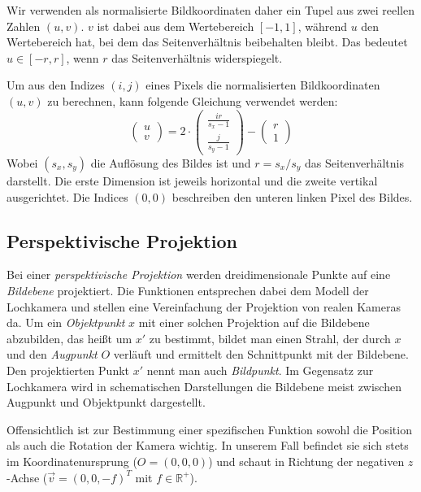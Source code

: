 \documentclass[ngerman,a4paper]{scrartcl}
\def \R{\mathbb{R}}
\begin{document}
Wir verwenden als normalisierte Bildkoordinaten daher ein Tupel aus zwei reellen Zahlen $(u,v)$. $v$ ist dabei aus dem Wertebereich $[-1,1]$, während $u$ den Wertebereich hat, bei dem das Seitenverhältnis beibehalten bleibt. Das bedeutet $u \in [-r,r]$, wenn $r$ das Seitenverhältnis widerspiegelt.

Um aus den Indizes $(i,j)$ eines Pixels die normalisierten Bildkoordinaten $(u,v)$ zu berechnen, kann folgende Gleichung verwendet werden:
\[ \begin{pmatrix}
u \\ v
\end{pmatrix} = 2 \cdot \begin{pmatrix}
\frac{i r}{s_x - 1} \\
\frac{j}{s_y - 1}
\end{pmatrix} - \begin{pmatrix}
r \\ 1
\end{pmatrix} \]
Wobei $(s_x, s_y)$ die Auflösung des Bildes ist und $r = s_x/s_y$ das Seitenverhältnis darstellt. Die erste Dimension ist jeweils horizontal und die zweite vertikal ausgerichtet. Die Indices $(0,0)$ beschreiben den unteren linken Pixel des Bildes.

\subsection{Perspektivische Projektion}

Bei einer \emph{perspektivische Projektion} werden dreidimensionale Punkte auf eine \emph{Bildebene} projektiert. Die Funktionen entsprechen dabei dem Modell der Lochkamera und stellen eine Vereinfachung der Projektion von realen Kameras da. Um ein \emph{Objektpunkt} $x$ mit einer solchen Projektion auf die Bildebene abzubilden, das heißt um $x'$ zu bestimmt, bildet man einen Strahl, der durch $x$ und den \emph{Augpunkt} $O$ verläuft und ermittelt den Schnittpunkt mit der Bildebene. Den projektierten Punkt $x'$ nennt man auch \emph{Bildpunkt}. Im Gegensatz zur Lochkamera wird in schematischen Darstellungen die Bildebene meist zwischen Augpunkt und Objektpunkt dargestellt.

Offensichtlich ist zur Bestimmung einer spezifischen Funktion sowohl die Position als auch die Rotation der Kamera wichtig. In unserem Fall befindet sie sich stets im Koordinatenursprung ($O = (0, 0, 0)$) und schaut in Richtung der negativen $z$-Achse ($\vec{v} = (0, 0, -f)^T$ mit $f \in \R^+$).
\end{document}

